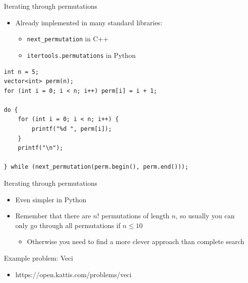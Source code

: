 \documentclass{beamer}
\begin{document}
\begin{frame}{Iterating through permutations}
    \begin{itemize}
        \item Already implemented in many standard libraries:
            \begin{itemize}
                \item \texttt{next\_{}permutation} in C++
                \item \texttt{itertools.permutations} in Python
            \end{itemize}
    \end{itemize}

            \begin{verbatim}
int n = 5;
vector<int> perm(n);
for (int i = 0; i < n; i++) perm[i] = i + 1;

do {
    for (int i = 0; i < n; i++) {
        printf("%d ", perm[i]);
    }
    printf("\n");

} while (next_permutation(perm.begin(), perm.end()));
            \end{verbatim}

\end{frame}

\begin{frame}[plain]{Iterating through permutations}
    \begin{itemize}
        \item Even simpler in Python
        \vspace{20pt}
        \item Remember that there are $n!$ permutations of length $n$, so usually you can only go through all permutations if $n \leq 10$
            \begin{itemize}
                \item Otherwise you need to find a more clever approach than complete search
            \end{itemize}
            \vspace{20pt}
    \end{itemize}
\end{frame}

\begin{frame}[plain]{Example problem: Veci}
    \begin{itemize}
        \item https://open.kattis.com/problems/veci
    \end{itemize}
\end{frame}
\end{document}
